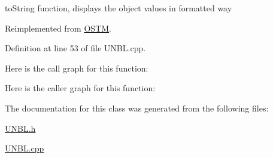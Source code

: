to\+String function, displays the object values in formatted way 

Reimplemented from \hyperlink{class_o_s_t_m_a513396a115f2987fd07c203309ae8a59}{O\+S\+TM}.



Definition at line 53 of file U\+N\+B\+L.\+cpp.



Here is the call graph for this function\+:




Here is the caller graph for this function\+:




The documentation for this class was generated from the following files\+:\begin{DoxyCompactItemize}
\item 
\hyperlink{_u_n_b_l_8h}{U\+N\+B\+L.\+h}\item 
\hyperlink{_u_n_b_l_8cpp}{U\+N\+B\+L.\+cpp}\end{DoxyCompactItemize}
